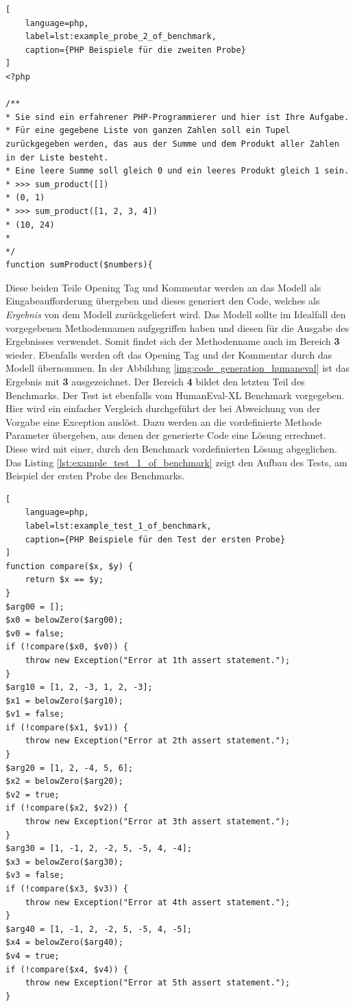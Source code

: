 \begin{lstlisting}[
	language=php,
	label=lst:example_probe_2_of_benchmark,
	caption={PHP Beispiele für die zweiten Probe}
]
<?php

/**
* Sie sind ein erfahrener PHP-Programmierer und hier ist Ihre Aufgabe.
* Für eine gegebene Liste von ganzen Zahlen soll ein Tupel zurückgegeben werden, das aus der Summe und dem Produkt aller Zahlen in der Liste besteht.
* Eine leere Summe soll gleich 0 und ein leeres Produkt gleich 1 sein.
* >>> sum_product([])
* (0, 1)
* >>> sum_product([1, 2, 3, 4])
* (10, 24)
*
*/
function sumProduct($numbers){
\end{lstlisting}
	
Diese beiden Teile Opening Tag und Kommentar werden an das Modell als Eingabeaufforderung übergeben und dieses generiert den Code, welches als \textit{Ergebnis} von dem Modell zurückgeliefert wird. Das Modell sollte im Idealfall den vorgegebenen Methodennamen aufgegriffen haben und diesen für die Ausgabe des Ergebnisses verwendet. Somit findet sich der Methodenname auch im Bereich \textbf{3} wieder. Ebenfalls werden oft das Opening Tag und der Kommentar durch das Modell übernommen. In der Abbildung \ref{img:code_generation_humaneval} ist das Ergebnis mit \textbf{3} ausgezeichnet. Der Bereich \textbf{4} bildet den letzten Teil des Benchmarks. Der Test ist ebenfalls vom HumanEval-XL Benchmark vorgegeben. Hier wird ein einfacher Vergleich durchgeführt der bei Abweichung von der Vorgabe eine Exception auslöst. Dazu werden an die vordefinierte Methode Parameter übergeben, aus denen der generierte Code eine Lösung errechnet. Diese wird mit einer, durch den Benchmark vordefinierten Lösung abgeglichen. Das Listing \ref{lst:example_test_1_of_benchmark} zeigt den Aufbau des Tests, am Beispiel der ersten Probe des Benchmarks.\vspace{0.2cm}

\begin{lstlisting}[
	language=php,
	label=lst:example_test_1_of_benchmark,
	caption={PHP Beispiele für den Test der ersten Probe}
]
function compare($x, $y) {
	return $x == $y;
}
$arg00 = [];
$x0 = belowZero($arg00);
$v0 = false;
if (!compare($x0, $v0)) {
	throw new Exception("Error at 1th assert statement.");
}
$arg10 = [1, 2, -3, 1, 2, -3];
$x1 = belowZero($arg10);
$v1 = false;
if (!compare($x1, $v1)) {
	throw new Exception("Error at 2th assert statement.");
}
$arg20 = [1, 2, -4, 5, 6];
$x2 = belowZero($arg20);
$v2 = true;
if (!compare($x2, $v2)) {
	throw new Exception("Error at 3th assert statement.");
}
$arg30 = [1, -1, 2, -2, 5, -5, 4, -4];
$x3 = belowZero($arg30);
$v3 = false;
if (!compare($x3, $v3)) {
	throw new Exception("Error at 4th assert statement.");
}
$arg40 = [1, -1, 2, -2, 5, -5, 4, -5];
$x4 = belowZero($arg40);
$v4 = true;
if (!compare($x4, $v4)) {
	throw new Exception("Error at 5th assert statement.");
}
\end{lstlisting}


